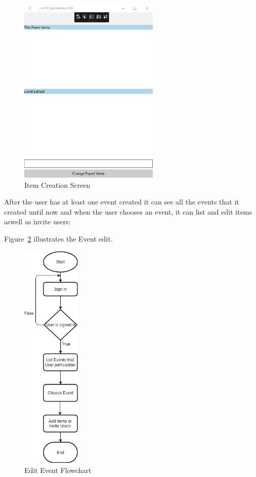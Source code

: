 \begin{figure}[!ht]
	\centering
	\includegraphics[width=0.60\textwidth,height=0.50\textheight]{./Chapter3/Figures/ClientAppScreenShots/Extract_01}
	\caption{Item Creation Screen}
	\label{fig:EventExtractScreenshot}
\end{figure}



\newpage

After the user has at least one event created it can see all the events that it created until now and when the user chooses an event, it can list and edit items aswell as invite users:

Figure~\ref{fig:EditEvent} illustrates the Event edit.

\begin{figure}[!ht]
	\centering
	\includegraphics[width=0.25\textwidth,height=0.50\textheight]{./Chapter3/Figures/Flowcharts/EditEventFlowChart}
	\caption{Edit Event Flowchart}
	\label{fig:EditEvent}
\end{figure}

